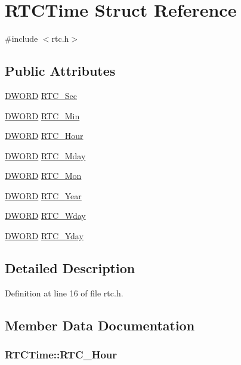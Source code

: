 \hypertarget{struct_r_t_c_time}{
\section{RTCTime Struct Reference}
\label{struct_r_t_c_time}
}


{\ttfamily \#include $<$rtc.h$>$}

\subsection*{Public Attributes}
\begin{DoxyCompactItemize}
\item 
\hyperlink{type_8h_ad342ac907eb044443153a22f964bf0af}{DWORD} \hyperlink{struct_r_t_c_time_ab14ec114407f3361087624eea5d43c19}{RTC\_\-Sec}
\item 
\hyperlink{type_8h_ad342ac907eb044443153a22f964bf0af}{DWORD} \hyperlink{struct_r_t_c_time_aa9c8cd2d54685a9c6aa7093d0e6cd1dd}{RTC\_\-Min}
\item 
\hyperlink{type_8h_ad342ac907eb044443153a22f964bf0af}{DWORD} \hyperlink{struct_r_t_c_time_a99de59f01d8936a698dd41ed8d45121b}{RTC\_\-Hour}
\item 
\hyperlink{type_8h_ad342ac907eb044443153a22f964bf0af}{DWORD} \hyperlink{struct_r_t_c_time_a5077e93b31e29a15d1f0d8191b9e9ea9}{RTC\_\-Mday}
\item 
\hyperlink{type_8h_ad342ac907eb044443153a22f964bf0af}{DWORD} \hyperlink{struct_r_t_c_time_ac01f07a46c73b86011342b90b8c1100a}{RTC\_\-Mon}
\item 
\hyperlink{type_8h_ad342ac907eb044443153a22f964bf0af}{DWORD} \hyperlink{struct_r_t_c_time_aefae78d754a8ef926f4d646e2b7f4bda}{RTC\_\-Year}
\item 
\hyperlink{type_8h_ad342ac907eb044443153a22f964bf0af}{DWORD} \hyperlink{struct_r_t_c_time_a4f063d5cc84028b06d4cdac73e0d74c9}{RTC\_\-Wday}
\item 
\hyperlink{type_8h_ad342ac907eb044443153a22f964bf0af}{DWORD} \hyperlink{struct_r_t_c_time_aad91737813b216f18c7268b74b33d91a}{RTC\_\-Yday}
\end{DoxyCompactItemize}


\subsection{Detailed Description}


Definition at line 16 of file rtc.h.



\subsection{Member Data Documentation}
\hypertarget{struct_r_t_c_time_a99de59f01d8936a698dd41ed8d45121b}{
\subsubsection[{RTC\_\-Hour}]{ {\bf RTCTime::RTC\_\-Hour}}}
\label{struct_r_t_c_time_a99de59f01d8936a698dd41ed8d45121b}


